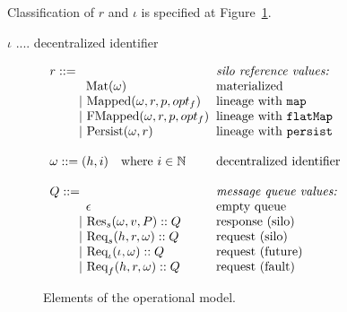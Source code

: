 \documentclass{article}
\theoremstyle{definition}
\newcommand{\gap}{\quad\quad}
\newcommand{\ba}{\begin{array}}
\newcommand{\ea}{\end{array}}
\newcommand{\Req}[3]{\text{Req}_s(#1, #2, #3)}
\newcommand{\Res}[3]{\text{Res}_s(#1, #2, #3)}
\newcommand{\ReqF}[2]{\text{Req}_{\iota}(#1, #2)}
\newcommand{\ReqE}[3]{\text{Req}_f(#1, #2, #3)}
\begin{document}
Classification of $r$ and $\iota$ is specified at Figure~\ref{fig:elems-opsem}.

$\iota$ .... decentralized identifier

\newpage

%
%

\begin{figure}[ht!]
\centering

$\ba[t]{l@{\hspace{2mm}}l}
r ::=                                                  & \mbox{{\it{silo reference values:}}} \\
\gap \:\:\:\: \text{Mat}(\omega)                       & \mbox{materialized} \\    
\gap ~|~  \text{Mapped}(\omega, r, p, opt_f)           & \mbox{lineage with \texttt{map}} \\    
\gap ~|~  \text{FMapped}(\omega, r, p, opt_f)          & \mbox{lineage with \texttt{flatMap}} \\   
\gap ~|~  \text{Persist}(\omega, r)                    & \mbox{lineage with \texttt{persist}} \\
                                                       & \\   
\omega  ::= (h,i) \quad \text{where}~i \in \mathbb{N}  & \mbox{decentralized identifier} \\
                                                       & \\
Q      ::=                                             & \mbox{{\it{message queue values:}}} \\
\gap \:\:\:\: \epsilon                                 & \mbox{empty queue} \\
\gap ~|~    {\Res \omega v P} :: Q                     & \mbox{response (silo)} \\
\gap ~|~    {\Req h r \omega} :: Q                     & \mbox{request (silo)}  \\
\gap ~|~    {\ReqF \iota \omega} :: Q                  & \mbox{request (future)}  \\
\gap ~|~    {\ReqE h r \omega} :: Q                    & \mbox{request (fault)} \\
\ea$

\caption{Elements of the operational model.}
\label{fig:elems-opsem}

\end{figure}
\end{document}
